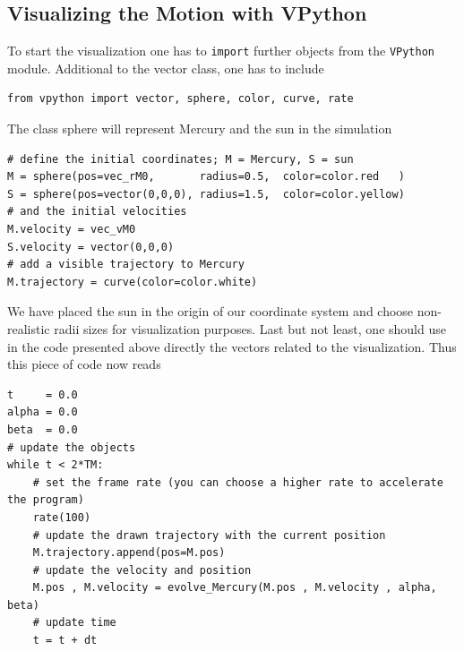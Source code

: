 \documentclass[12pt,ngerman,american]{iopart}
\begin{document}
\subsection{Visualizing the Motion with VPython}
To start the visualization one has to \texttt{import} further objects from the \texttt{VPython} module.
Additional to the vector class, one has to include
\begin{lstlisting}
from vpython import vector, sphere, color, curve, rate
\end{lstlisting}
The class sphere will represent Mercury and the sun in the simulation
\begin{lstlisting}
# define the initial coordinates; M = Mercury, S = sun
M = sphere(pos=vec_rM0,       radius=0.5,  color=color.red   )
S = sphere(pos=vector(0,0,0), radius=1.5,  color=color.yellow)
# and the initial velocities
M.velocity = vec_vM0
S.velocity = vector(0,0,0)
# add a visible trajectory to Mercury
M.trajectory = curve(color=color.white)
\end{lstlisting}
We have placed the sun in the origin of our coordinate system and choose non-realistic radii sizes for visualization purposes.
Last but not least, one should use in the code presented above directly the vectors related to the visualization. Thus
this piece of code now reads
\begin{lstlisting}
t     = 0.0
alpha = 0.0
beta  = 0.0
# update the objects
while t < 2*TM:
	# set the frame rate (you can choose a higher rate to accelerate the program)
	rate(100)
	# update the drawn trajectory with the current position
	M.trajectory.append(pos=M.pos)
	# update the velocity and position
	M.pos , M.velocity = evolve_Mercury(M.pos , M.velocity , alpha, beta)
	# update time
	t = t + dt
\end{lstlisting}
\end{document}
